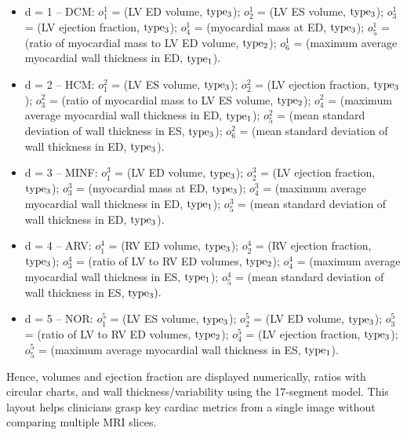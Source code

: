 \documentclass[fleqn,10pt]{wlscirep}
\begin{document}
\begin{itemize}
    \item d = 1 – DCM: \(o_1^1\) = (LV ED volume, \({\rm{typ}}{{\rm{e}}_3}\)); \(o_2^1\) = (LV ES volume, \({\rm{typ}}{{\rm{e}}_3}\)); \(o_3^1\) = (LV ejection fraction, \({\rm{typ}}{{\rm{e}}_3}\)); \(o_4^1\) = (myocardial mass at ED, \({\rm{typ}}{{\rm{e}}_3}\)); \(o_5^1\) = (ratio of myocardial mass to LV ED volume, \({\rm{typ}}{{\rm{e}}_2}\)); \(o_6^1\) = (maximum average myocardial wall thickness in ED, \({\rm{typ}}{{\rm{e}}_1}\)).
    \item d = 2 – HCM: \(o_1^2\) = (LV ES volume, \({\rm{typ}}{{\rm{e}}_3}\)); \(o_2^2\) = (LV ejection fraction, \({\rm{typ}}{{\rm{e}}_3}\)); \(o_3^2\) = (ratio of myocardial mass to LV ES volume, \({\rm{typ}}{{\rm{e}}_2}\)); \(o_4^2\) = (maximum average myocardial wall thickness in ED, \({\rm{typ}}{{\rm{e}}_1}\)); \(o_5^2\) = (mean standard deviation of wall thickness in ES, \({\rm{typ}}{{\rm{e}}_3}\)); \(o_6^2\) = (mean standard deviation of wall thickness in ED, \({\rm{typ}}{{\rm{e}}_3}\)).
    \item d = 3 – MINF: \(o_1^3\) = (LV ED volume, \({\rm{typ}}{{\rm{e}}_3}\)); \(o_2^3\) = (LV ejection fraction, \({\rm{typ}}{{\rm{e}}_3}\)); \(o_3^3\) = (myocardial mass at ED, \({\rm{typ}}{{\rm{e}}_3}\)); \(o_4^3\) = (maximum average myocardial wall thickness in ED, \({\rm{typ}}{{\rm{e}}_1}\)); \(o_5^3\) = (mean standard deviation of wall thickness in ED, \({\rm{typ}}{{\rm{e}}_3}\)).
    \item d = 4 – ARV: \(o_1^4\) = (RV ED volume, \({\rm{typ}}{{\rm{e}}_3}\)); \(o_2^4\) = (RV ejection fraction, \({\rm{typ}}{{\rm{e}}_3}\)); \(o_3^4\) = (ratio of LV to RV ED volumes, \({\rm{typ}}{{\rm{e}}_2}\)); \(o_4^4\) = (maximum average myocardial wall thickness in ES, \({\rm{typ}}{{\rm{e}}_1}\)); \(o_5^4\) = (mean standard deviation of wall thickness in ES, \({\rm{typ}}{{\rm{e}}_3}).\)
    \item d = 5 – NOR: \(o_1^5\) = (LV ES volume, \({\rm{typ}}{{\rm{e}}_3}\)); \(o_2^5\) = (LV ED volume, \({\rm{typ}}{{\rm{e}}_3}\)); \(o_3^5\) = (ratio of LV to RV ED volumes, \({\rm{typ}}{{\rm{e}}_2}\)); \(o_4^5\) = (LV ejection fraction, \({\rm{typ}}{{\rm{e}}_3}\)); \(o_5^5\) = (maximum average myocardial wall thickness in ES, \({\rm{typ}}{{\rm{e}}_1}\)).
\end{itemize}

Hence, volumes and ejection fraction are displayed numerically, ratios with circular charts, and wall thickness/variability using the 17-segment model. This layout helps clinicians grasp key cardiac metrics from a single image without comparing multiple MRI slices.
\end{document}
